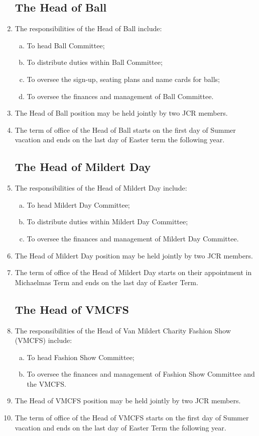 \documentclass[12pt]{article}
\begin{document}
\begin{enumerate}
    \subsection{The Head of Ball}
    \item The responsibilities of the Head of Ball include:
    \begin{enumerate}[(a)]
        \item To head Ball Committee;
        \item To distribute duties within Ball Committee;
        \item To oversee the sign-up, seating plans and name cards for balls;
        \item To oversee the finances and management of Ball Committee.
    \end{enumerate}
    \item The Head of Ball position may be held jointly by two JCR members.
    \item The term of office of the Head of Ball starts on the first day of Summer vacation and ends on the last day of Easter term the following year.
    \subsection{The Head of Mildert Day}
    \item The responsibilities of the Head of Mildert Day include:
    \begin{enumerate}[(a)]
        \item To head Mildert Day Committee;
        \item To distribute duties within Mildert Day Committee;
        \item To oversee the finances and management of Mildert Day Committee.
    \end{enumerate}
    \item The Head of Mildert Day position may be held jointly by two JCR members.
    \item The term of office of the Head of Mildert Day starts on their appointment in Michaelmas Term and ends on the last day of Easter Term.
    \subsection{The Head of VMCFS}
    \item The responsibilities of the Head of Van Mildert Charity Fashion Show (VMCFS) include:
    \begin{enumerate}[(a)]
        \item To head Fashion Show Committee;
        \item To oversee the finances and management of Fashion Show Committee and the VMCFS.
    \end{enumerate}
    \item The Head of VMCFS position may be held jointly by two JCR members.
    \item The term of office of the Head of VMCFS starts on the first day of Summer vacation and ends on the last day of Easter Term the following year.


\end{enumerate}
\end{document}
